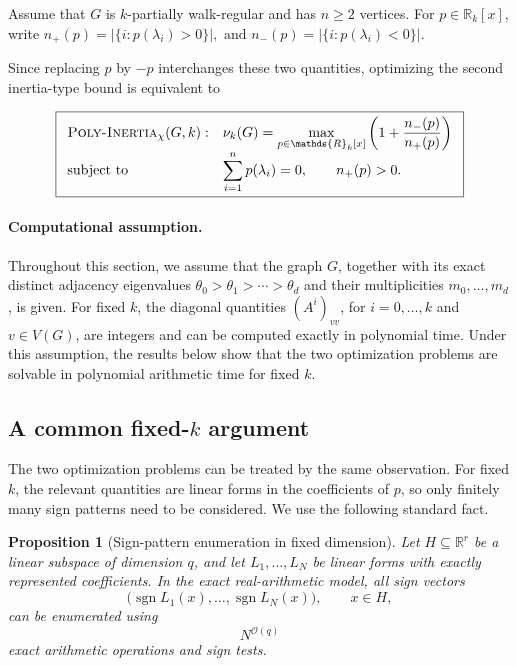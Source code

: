 \documentclass[10pt]{article}
\newtheorem{proposition}[theorem]{Proposition}
\newcommand{\RR}{\mathds{R}}
\begin{document}
Assume that \(G\) is \(k\)-partially walk-regular and has \(n\geq2\) vertices. For
\(p\in\RR_k[x]\), write
\(
n_+(p)=|\{i:p(\lambda_i)>0\}|, \text{ and }
n_-(p)=|\{i:p(\lambda_i)<0\}|.
\)

Since replacing \(p\) by \(-p\) interchanges these two
quantities, optimizing the second inertia-type bound is equivalent to

\begin{equation}
\label{eq:poly-inertia-chi-problem}
\boxed{
\begin{array}{ll}
\textsc{Poly-Inertia}_{\chi}(G,k):
&
\displaystyle
\nu_k(G)=
\max_{p\in\RR_k[x]}
\left(
1+\frac{n_-(p)}{n_+(p)}
\right)
\\
\text{subject to}
&
\displaystyle
\sum_{i=1}^{n}p(\lambda_i)=0,
\qquad n_+(p)>0.
\end{array}
}
\end{equation}

\paragraph{Computational assumption.}
Throughout this section, we assume that the graph \(G\),
together with its exact distinct adjacency eigenvalues
\(\theta_0>\theta_1>\cdots>\theta_d\) and their multiplicities
\(m_0,\ldots,m_d\), is given. For fixed \(k\), the diagonal quantities
\((A^i)_{vv}\), for \(i=0,\ldots,k\) and \(v\in V(G)\),
are integers and can be computed exactly in polynomial
time. Under this assumption, the results below show that
the two optimization problems are solvable in polynomial arithmetic time
for fixed \(k\).

\subsection{A common fixed-\(k\) argument}

The two optimization problems can be treated by the same observation.
For fixed \(k\), the relevant quantities are linear forms in the
coefficients of \(p\), so only finitely many sign patterns need to be
considered. We use the following standard fact.

\begin{proposition}[Sign-pattern enumeration in fixed dimension]
\label{prop:sign-pattern-optimization}
Let \(H\subseteq\mathbb{R}^r\) be a linear subspace of dimension \(q\),
and let \(L_1,\ldots,L_N\) be linear forms with exactly represented
coefficients. In the exact real-arithmetic model, all sign vectors
\[
    \bigl(
        \operatorname{sgn}L_1(x),\ldots,
        \operatorname{sgn}L_N(x)
    \bigr),
    \qquad x\in H,
\]
can be enumerated using
\[
    N^{\mathcal O(q)}
\]
exact arithmetic operations and sign tests.
\end{proposition}
\end{document}
